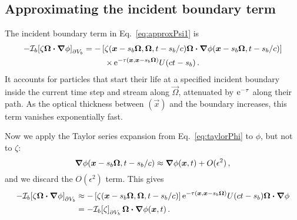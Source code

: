 \subsection{Approximating the incident boundary term}
The incident boundary term in Eq.~\eqref{eq:approxPsi1} is
\begin{multline*}
-\mathcal{I}_{b}\!\left[\zeta \bm{\Omega}\bm{\cdot} \bm{\nabla} \phi\right]_{\partial V_b}
  = -\left[\zeta(\bm{x} - s_b\bm{\Omega}, \bm{\Omega}, t - s_b/c)
   \bm{\Omega}\bm{\cdot} \bm{\nabla} \phi(\bm{x} - s_b\bm{\Omega}, t - s_b/c) \right]
   \\
\times
    \mathop{}\!\mathrm{e}^{ -\tau(\bm{x}, \bm{x} - s_b \bm{\Omega})}
    U(ct - s_b) \,.
\end{multline*}
It accounts for particles that start their life at a specified incident boundary
inside the current time step and stream along $\vec{\Omega}$, attenuated by
$\mathop{}\!\mathrm{e}^{-\tau}$ along their path. As the optical thickness between
$(\vec{x})$ and the boundary increases, this term vanishes
exponentially fast.

Now we apply the Taylor series expansion from Eq.~\eqref{eq:taylorPhi} to
$\phi$, but not to $\zeta$:
\begin{equation*}
  \bm{\nabla} \phi(\bm{x} - s_b\bm{\Omega}, t - s_b/c)
  \approx \bm{\nabla} \phi(\bm{x}, t) + O(\epsilon^2)\,,
\end{equation*}
and we discard the $O(\epsilon^2)$ term. This gives
\begin{align} \nonumber
-\mathcal{I}_{b}\!\left[\zeta \bm{\Omega}\bm{\cdot} \bm{\nabla} \phi\right]_{\partial V_b}
&\approx -\left[\zeta(\bm{x} - s_b\bm{\Omega}, \bm{\Omega}, t - s_b/c) \right]
  \mathop{}\!\mathrm{e}^{ -\tau(\bm{x}, \bm{x} - s_b \bm{\Omega})} U(ct - s_b)
  \bm{\Omega}\bm{\cdot} \bm{\nabla} \phi
 \\ \label{eq:bndyApprox}
&= -\mathcal{I}_{b}\!\left[\zeta\right]_{\partial V_b} \bm{\Omega}\bm{\cdot} \bm{\nabla} \phi(\bm{x}, t) \,.
\end{align}

